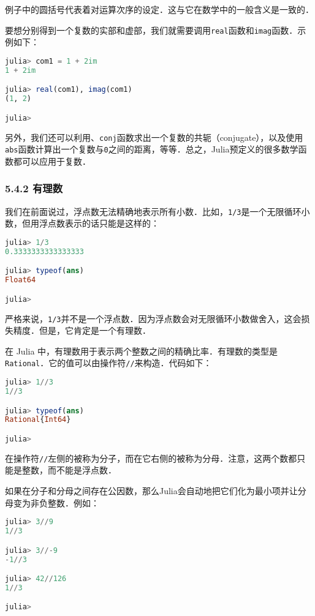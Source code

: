 例子中的圆括号代表着对运算次序的设定．这与它在数学中的一般含义是一致的．

要想分别得到一个复数的实部和虚部，我们就需要调用\verb|real|函数和\verb|imag|函数．示例如下：
\begin{lstlisting}[language=julia]
julia> com1 = 1 + 2im 
1 + 2im

julia> real(com1), imag(com1)
(1, 2)

julia> 
\end{lstlisting}

另外，我们还可以利用、\verb|conj|函数求出一个复数的共轭（conjugate），以及使用\verb|abs|函数计算出一个复数与\verb|0|之间的距离，等等．总之，Julia预定义的很多数学函数都可以应用于复数．

\subsubsection{5.4.2 有理数}

我们在前面说过，浮点数无法精确地表示所有小数．比如，\verb|1/3|是一个无限循环小数，但用浮点数表示的话只能是这样的：
\begin{lstlisting}[language=julia]
julia> 1/3
0.3333333333333333

julia> typeof(ans)
Float64

julia> 
\end{lstlisting}

严格来说，\verb|1/3|并不是一个浮点数．因为浮点数会对无限循环小数做舍入，这会损失精度．但是，它肯定是一个有理数．

在 Julia 中，有理数用于表示两个整数之间的精确比率．有理数的类型是\verb|Rational|．它的值可以由操作符\verb|//|来构造．代码如下：
\begin{lstlisting}[language=julia]
julia> 1//3
1//3

julia> typeof(ans)
Rational{Int64}

julia> 
\end{lstlisting}

在操作符\verb|//|左侧的被称为分子，而在它右侧的被称为分母．注意，这两个数都只能是整数，而不能是浮点数．

如果在分子和分母之间存在公因数，那么Julia会自动地把它们化为最小项并让分母变为非负整数．例如：
\begin{lstlisting}[language=julia]
julia> 3//9
1//3

julia> 3//-9
-1//3

julia> 42//126
1//3

julia> 
\end{lstlisting}

